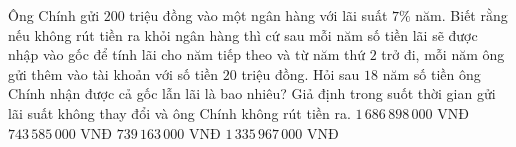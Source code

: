 \begin{ex}%
	Ông Chính gửi $200$ triệu đồng vào  một ngân hàng với lãi suất $7\%$ năm. Biết rằng nếu không rút tiền ra khỏi ngân hàng thì cứ sau mỗi năm số tiền lãi sẽ được nhập vào gốc để tính lãi cho năm tiếp theo và từ năm thứ $2$ trở đi, mỗi năm ông gửi thêm vào tài khoản với số tiền $20$ triệu đồng. Hỏi sau $18$ năm số tiền ông Chính nhận được cả gốc lẫn lãi là bao nhiêu? Giả định trong suốt thời gian gửi lãi suất không thay đổi và ông Chính không rút tiền ra.
	 \choice
		 {$1\,686\,898\,000$ VNĐ}
		{ $743\,585\,000$ VNĐ} 
		{$739\,163\,000$  VNĐ}
		{\True $1\,335\,967\,000$ VNĐ} 
\end{ex}



